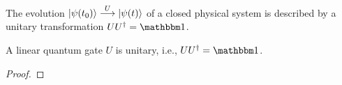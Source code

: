 		\begin{postulate}
			The evolution \( \ket{\psi(t_0)} \overset{U}{\longrightarrow} \ket{\psi(t)} \) of a closed physical system is described by a unitary transformation \( U U^\dagger = \ID \).
		\end{postulate}

		\begin{theorem}
			A linear quantum gate \(U\) is unitary, i.e., \( U U^\dagger = \ID \).
		\end{theorem}
		\begin{proof}

\end{proof}
